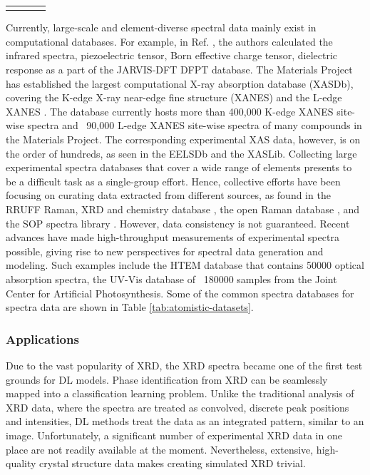 \documentclass[pdflatex,sn-mathphys]{sn-jnl}%
\theoremstyle{thmstyleone}%
\theoremstyle{thmstyletwo}%
\theoremstyle{thmstylethree}%
\begin{document}
\begin{table}[ht]
\begin{minipage}{174pt}
\begin{tabular}{c|c|c|c}
\botrule
\end{tabular}
\end{minipage}
\end{table}


Currently, large-scale and element-diverse spectral data mainly exist in computational databases. For example, in Ref. \cite{choudhary2020high}, the authors calculated the infrared spectra, piezoelectric tensor, Born effective charge tensor, dielectric response as a part of the JARVIS-DFT DFPT database. The Materials Project has established the largest computational X-ray absorption database (XASDb), covering the K-edge X-ray near-edge fine structure (XANES) \cite{zhengAutomatedGenerationEnsemblelearned2018,mathew2018high} and the L-edge XANES \cite{chen2021database}. The database currently hosts more than 400,000 K-edge XANES site-wise spectra and ~90,000 L-edge XANES site-wise spectra of many compounds in the Materials Project. The corresponding experimental XAS data, however, is on the order of hundreds, as seen in the EELSDb and the XASLib. Collecting large experimental spectra databases that cover a wide range of elements presents to be a difficult task as a single-group effort. Hence, collective efforts have been focusing on curating data extracted from different sources, as found in the RRUFF Raman, XRD and chemistry database \cite{lafuente20151}, the open Raman database \cite{el2019raman}, and the SOP spectra library \cite{fremout2012identification}. However, data consistency is not guaranteed.  Recent advances have made high-throughput measurements of experimental spectra possible, giving rise to new perspectives for spectral data generation and modeling. Such examples include the HTEM database \cite{zakutayev2018open} that contains 50000 optical absorption spectra, the UV-Vis database of ~180000 samples from the Joint Center for Artificial Photosynthesis.  Some of the common spectra databases for spectra data are shown in Table \ref{tab:atomistic-datasets}.





\subsubsection{Applications}
Due to the vast popularity of XRD, the XRD spectra became one of the first test grounds for DL models. Phase identification from XRD can be seamlessly mapped into a classification learning problem. Unlike the traditional analysis of XRD data, where the spectra are treated as convolved, discrete peak positions and intensities, DL methods treat the data as an integrated pattern, similar to an image. Unfortunately, a significant number of experimental XRD data in one place are not readily available at the moment. Nevertheless, extensive, high-quality crystal structure data makes creating simulated XRD trivial.
\end{document}

